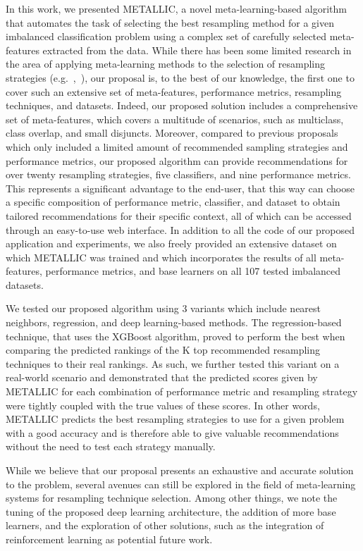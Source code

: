 \documentclass{article}
\begin{document}
In this work, we presented METALLIC, a novel meta-learning-based algorithm that automates the task of selecting the best resampling method for a given imbalanced classification problem using a complex set of carefully selected meta-features extracted from the data. While there has been some limited research in the area of applying meta-learning methods to the selection of resampling strategies (e.g.~\cite{monizAutomatedImbalancedClassification2021},~\cite{sahniAidedSelectionSampling2021}), our proposal is, to the best of our knowledge, the first one to cover such an extensive set of meta-features, performance metrics, resampling techniques, and datasets. Indeed, our proposed solution includes a comprehensive set of meta-features, which covers a multitude of scenarios, such as multiclass, class overlap, and small disjuncts. Moreover, compared to previous proposals which only included a limited amount of recommended sampling strategies and performance metrics, our proposed algorithm can provide recommendations for over twenty resampling strategies, five classifiers, and nine performance metrics. This represents a significant advantage to the end-user, that this way can choose a specific composition of performance metric, classifier, and dataset to obtain tailored recommendations for their specific context, all of which can be accessed through an easy-to-use web interface. In addition to all the code of our proposed application and experiments, we also freely provided an extensive dataset on which METALLIC was trained and which incorporates the results of all meta-features, performance metrics, and base learners on all 107 tested imbalanced datasets.

We tested our proposed algorithm using 3 variants which include nearest neighbors, regression, and deep learning-based methods. The regression-based technique, that uses the XGBoost algorithm, proved to perform the best when comparing the predicted rankings of the K top recommended resampling techniques to their real rankings. As such, we further tested this variant on a real-world scenario and demonstrated that the predicted scores given by METALLIC for each combination of performance metric and resampling strategy were tightly coupled with the true values of these scores. In other words, METALLIC predicts the best resampling strategies to use for a given problem with a good accuracy and is therefore able to give valuable recommendations without the need to test each strategy manually.

While we believe that our proposal presents an exhaustive and accurate solution to the problem, several avenues can still be explored in the field of meta-learning systems for resampling technique selection. Among other things, we note the tuning of the proposed deep learning architecture, the addition of more base learners, and the exploration of other solutions, such as the integration of reinforcement learning as potential future work.
\end{document}
